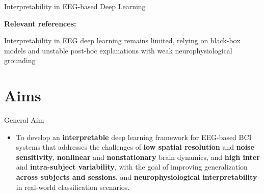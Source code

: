 \documentclass[aspectratio=169]{beamer}
\let\oldcite\cite
\renewcommand{\cite}[1]{{\tiny\oldcite{#1}}}
\begin{document}
\begin{frame}{Interpretability in EEG-based Deep Learning}
\vspace{0.4em}

\textbf{ \scriptsize Relevant references:} 
\cite{sturm2016interpretable,Selvaraju2016,liu2023cam,ahmed2023,liu2023multiattention,collazos2023posthoc}

\begin{center}
    \centering\textcolor{frameblue}{Interpretability in EEG deep learning remains limited, relying on black-box models and unstable post-hoc explanations with weak neurophysiological grounding \cite{zhou2024interpretable_robust_eeg}}
\end{center}
\end{frame}

\section{Aims}

\begin{frame}{General Aim}

   \begin{itemize}
\justifying
   \item To develop an \textbf{interpretable} deep learning framework for {EEG-based BCI systems} that addresses the challenges of \textbf{low spatial resolution} and \textbf{noise sensitivity}, \textbf{nonlinear} and \textbf{nonstationary} brain dynamics, and \textbf{high inter} and \textbf{intra-subject variability}, with the goal of improving generalization  \textbf{across subjects and sessions}, and \textbf{neurophysiological interpretability} in {real-world classification scenarios}.

   \end{itemize}
\end{frame}
\end{document}
